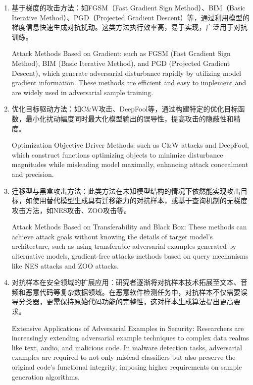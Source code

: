 \begin{enumerate} [label=\arabic*)] 
\item 基于梯度的攻击方法：如FGSM\cite{lupart2023study}（Fast Gradient Sign Method）、BIM\cite{kurakin2016adversarial}（Basic Iterative Method）、PGD\cite{bryniarski2021evading}（Projected Gradient Descent）等，通过利用模型的梯度信息快速生成对抗扰动。这类方法执行效率高，易于实现，广泛用于对抗训练。

Attack Methods Based on Gradient: such as FGSM\cite{lupart2023study} (Fast Gradient Sign Method), BIM\cite{kurakin2016adversarial} (Basic Iterative Method), and PGD\cite{bryniarski2021evading} (Projected Gradient Descent), which generate adversarial disturbance rapidly by utilizing model gradient information. These methods are efficient and easy to implement and are widely used in adversarial sample training.
\item 优化目标驱动方法：如C\&W攻击\cite{carlini2017towards}、DeepFool\cite{moosavi2016deepfool}等，通过构建特定的优化目标函数，最小化扰动幅度同时最大化模型输出的误导性，提高攻击的隐蔽性和精度。

Optimization Objective Driver Methods: such as C\&W attacks\cite{carlini2017towards} and DeepFool\cite{moosavi2016deepfool}, which construct functions optimizing objects to minimize disturbance magnitudes while misleading model maximally, enhancing attack concealment and precision.
\item 迁移型与黑盒攻击方法：此类方法在未知模型结构的情况下依然能实现攻击目标，如使用替代模型生成具有迁移能力的对抗样本，或基于查询机制的无梯度攻击方法，如NES攻击\cite{ilyas2017query}、ZOO攻击\cite{chen2017zoo}等。

Attack Methods Based on Transferability and Black Box: These methods can achieve attack goals without knowing the details of target model’s architecture, such as using transferable adversarial examples generated by alternative models, gradient-free attacks methods based on query mechanisms like NES attacks\cite{ilyas2017query} and ZOO attacks\cite{chen2017zoo}.
\item 对抗样本在安全领域的扩展应用：研究者逐渐将对抗样本技术拓展至文本、音频和恶意代码等复杂数据领域。在恶意软件检测任务中，对抗样本不仅需要误导分类器，更需保持原始代码功能的完整性，这对样本生成算法提出更高要求。

Extensive Applications of Adversarial Examples in Security: Researchers are increasingly extending adversarial example techniques to complex data realms like text, audio, and malicious code. In malware detection tasks, adversarial examples are required to not only mislead classifiers but also preserve the original code’s functional integrity, imposing higher requirements on sample generation algorithms.
\end{enumerate}

